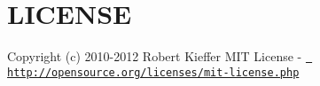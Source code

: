 \chapter{LICENSE}
\hypertarget{md__c_1_2_users_2_s_t_r_i_d_e_r_2source_2repos_2_internal_a_p_i_2_internal_a_p_i_2wwwroot_2lib_204359a4cc14e38f9d9624cc9cb79eae5}{}\label{md__c_1_2_users_2_s_t_r_i_d_e_r_2source_2repos_2_internal_a_p_i_2_internal_a_p_i_2wwwroot_2lib_204359a4cc14e38f9d9624cc9cb79eae5}
Copyright (c) 2010-\/2012 Robert Kieffer MIT License -\/ \href{http://opensource.org/licenses/mit-license.php}{\texttt{ http\+://opensource.\+org/licenses/mit-\/license.\+php}} 